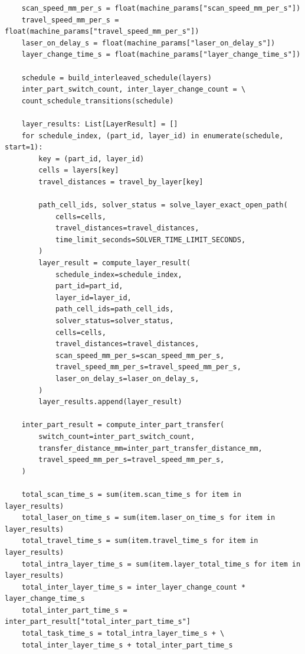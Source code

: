 \documentclass[a4paper, 12pt]{ctexart}
\begin{document}
\begin{verbatim}
    scan_speed_mm_per_s = float(machine_params["scan_speed_mm_per_s"])
    travel_speed_mm_per_s = float(machine_params["travel_speed_mm_per_s"])
    laser_on_delay_s = float(machine_params["laser_on_delay_s"])
    layer_change_time_s = float(machine_params["layer_change_time_s"])

    schedule = build_interleaved_schedule(layers)
    inter_part_switch_count, inter_layer_change_count = \
    count_schedule_transitions(schedule)

    layer_results: List[LayerResult] = []
    for schedule_index, (part_id, layer_id) in enumerate(schedule, start=1):
        key = (part_id, layer_id)
        cells = layers[key]
        travel_distances = travel_by_layer[key]

        path_cell_ids, solver_status = solve_layer_exact_open_path(
            cells=cells,
            travel_distances=travel_distances,
            time_limit_seconds=SOLVER_TIME_LIMIT_SECONDS,
        )
        layer_result = compute_layer_result(
            schedule_index=schedule_index,
            part_id=part_id,
            layer_id=layer_id,
            path_cell_ids=path_cell_ids,
            solver_status=solver_status,
            cells=cells,
            travel_distances=travel_distances,
            scan_speed_mm_per_s=scan_speed_mm_per_s,
            travel_speed_mm_per_s=travel_speed_mm_per_s,
            laser_on_delay_s=laser_on_delay_s,
        )
        layer_results.append(layer_result)

    inter_part_result = compute_inter_part_transfer(
        switch_count=inter_part_switch_count,
        transfer_distance_mm=inter_part_transfer_distance_mm,
        travel_speed_mm_per_s=travel_speed_mm_per_s,
    )

    total_scan_time_s = sum(item.scan_time_s for item in layer_results)
    total_laser_on_time_s = sum(item.laser_on_time_s for item in layer_results)
    total_travel_time_s = sum(item.travel_time_s for item in layer_results)
    total_intra_layer_time_s = sum(item.layer_total_time_s for item in layer_results)
    total_inter_layer_time_s = inter_layer_change_count * layer_change_time_s
    total_inter_part_time_s = inter_part_result["total_inter_part_time_s"]
    total_task_time_s = total_intra_layer_time_s + \
    total_inter_layer_time_s + total_inter_part_time_s


\end{verbatim}
\end{document}
